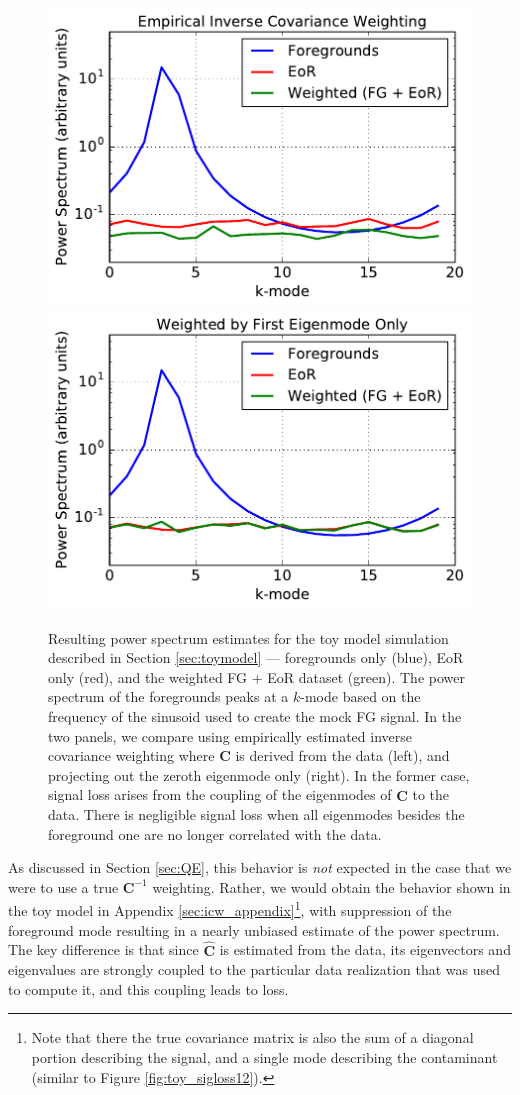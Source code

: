 \documentclass[preprint2,numberedappendix,tighten]{aastex6}  %
\begin{document}
\begin{figure}
	\centering
	\includegraphics[trim={0cm 0cm 0cm 0cm},clip,height=0.33\textwidth]{plots/toy_sigloss3.pdf}
	\includegraphics[trim={0cm 0cm 0cm 0cm},clip,height=0.33\textwidth]{plots/toy_sigloss4.pdf}
	\caption{Resulting power spectrum estimates for the toy model simulation described in Section \ref{sec:toymodel} --- foregrounds only (blue), EoR only (red), and the weighted FG + EoR dataset (green). The power spectrum of the foregrounds peaks at a $k$-mode based on the frequency of the sinusoid used to create the mock FG signal. In the two panels, we compare using empirically estimated inverse covariance weighting where $\textbf{C}$ is derived from the data (left), and projecting out the zeroth eigenmode only (right). In the former case, signal loss arises from the coupling of the eigenmodes of $\widehat{\textbf{C}}$ to the data. 
There is negligible signal loss when all eigenmodes besides the foreground one are no longer correlated with the data.
}
	\label{fig:toy_sigloss3}
\end{figure}

As discussed in Section \ref{sec:QE}, this behavior is {\it not} expected in the case that we were to use a true $\textbf{C}^{-1}$ weighting.  Rather, we would obtain the behavior shown in the toy model in Appendix \ref{sec:icw_appendix}\footnote{Note that there the true covariance matrix is also the sum of a diagonal portion describing the signal, and a single mode describing the contaminant (similar to Figure \ref{fig:toy_sigloss12}).}, with suppression of the foreground mode resulting in a nearly unbiased estimate of the power spectrum.   The key difference is that since $\widehat{\textbf{C}}$ is estimated from the data, its eigenvectors and eigenvalues are strongly coupled to the particular data realization that was used to compute it, and this coupling leads to loss.
\end{document}

